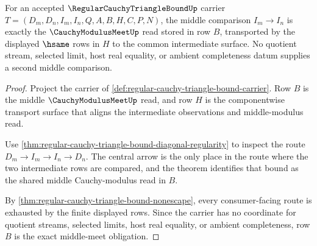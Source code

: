 \begin{theorem}
\label{thm:regular-cauchy-triangle-bound-middle-meet-exactness}
For an accepted $\RegularCauchyTriangleBoundUp$ carrier $T=(D_m,D_n,I_m,I_n,Q,A,B,H,C,P,N)$, the middle comparison $I_m \longrightarrow I_n$ is exactly the $\CauchyModulusMeetUp$ read stored in row $B$, transported by the displayed $\hsame$ rows in $H$ to the common intermediate surface. No quotient stream, selected limit, host real equality, or ambient completeness datum supplies a second middle comparison.
\end{theorem}
\begin{proof}
Project the carrier of \autoref{def:regular-cauchy-triangle-bound-carrier}. Row $B$ is the middle $\CauchyModulusMeetUp$ read, and row $H$ is the componentwise transport surface that aligns the intermediate observations and middle-modulus read.

Use \autoref{thm:regular-cauchy-triangle-bound-diagonal-regularity} to inspect the route $D_m \longrightarrow I_m \longrightarrow I_n \longrightarrow D_n$. The central arrow is the only place in the route where the two intermediate rows are compared, and the theorem identifies that bound as the shared middle Cauchy-modulus read in $B$.

By \autoref{thm:regular-cauchy-triangle-bound-nonescape}, every consumer-facing route is exhausted by the finite displayed rows. Since the carrier has no coordinate for quotient streams, selected limits, host real equality, or ambient completeness, row $B$ is the exact middle-meet obligation.
\end{proof}

